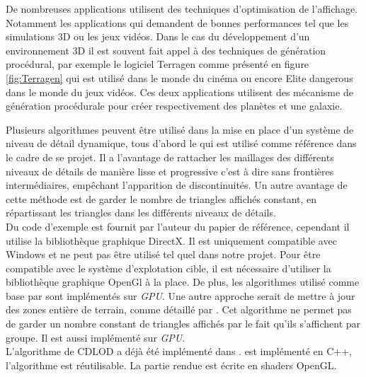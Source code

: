 \documentclass[12pt]{report}
\begin{document}

De nombreuses applications utilisent des techniques d'optimisation de
l'affichage. Notamment les applications qui demandent de bonnes
performances tel que les simulations 3D ou les jeux vidéos.
Dans le cas du développement d'un environnement 3D il est souvent fait
appel à des techniques de génération procédural, par exemple le logiciel
Terragen comme présenté en figure \ref{fig:Terragen} qui est utilisé dans 
le monde du cinéma ou encore Elite  dangerous dans le monde du jeux vidéos.  
Ces deux applications utilisent des mécanisme de génération procédurale pour
créer respectivement des planètes et une galaxie.

Plusieurs algorithmes peuvent être utilisé dans la mise en place d'un
système de niveau de détail dynamique, tous d'abord le \cite{CDLOD} qui
est utilisé comme référence dans le cadre de se projet.  Il a l'avantage
de rattacher les maillages des différents niveaux de détails de manière
lisse et progressive c'est à dire sans frontières intermédiaires,
empêchant l'apparition de discontinuités.  Un autre avantage de cette
méthode est de garder le nombre de triangles affichés constant, en
répartissant les triangles dans les différents niveaux de détails.\\
Du code d'exemple est fournit par l'auteur du papier de référence,
cependant il utilise la bibliothèque graphique DirectX. Il est
uniquement compatible avec Windows et ne peut pas être utilisé tel quel
dans notre projet.  Pour être compatible avec le système d'explotation
cible, il est nécessaire d'utiliser la bibliothèque graphique OpenGl à la
place. De plus, les algorithmes utilisé comme base par \cite{CDLOD} sont
implémentés sur \emph{GPU}.  Une autre approche serait de mettre à jour
des zones entière de terrain, comme détaillé par \cite{MassiveTerrain}.
Cet algorithme ne permet pas de garder un nombre constant de triangles
affichés par le fait qu'ils s'affichent par groupe. Il est aussi
implémenté sur \emph{GPU}.\\
L'algorithme de CDLOD a déjà été implémenté dans \cite{WorldGenerator}.
\cite{WorldGenerator} est implémenté en C++, l'algorithme est
réutilisable. La partie rendue est écrite en shaders OpenGL.
\end{document}
